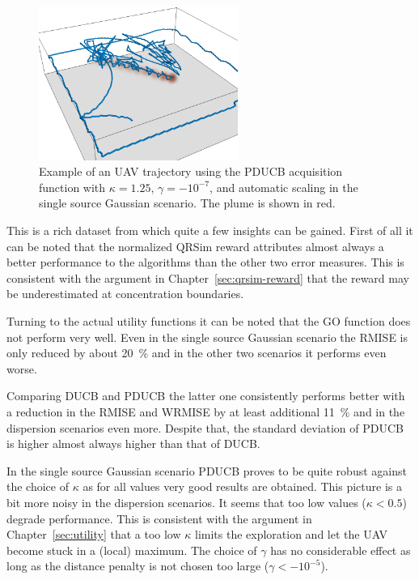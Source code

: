 \begin{figure}
    \centering
    \includegraphics[width=6.5cm]{plots/trajectory}
    \caption[Example of an UAV trajectory]{Example of an UAV trajectory using 
        the PDUCB acquisition function with $\kappa = 1.25$, $\gamma 
        = -10^{-7}$, and automatic scaling in the single source Gaussian 
        scenario. The plume is shown in red.}\label{fig:trajectory}
\end{figure}

This is a rich dataset from which quite a few insights can be gained. First of 
all it can be noted that the normalized QRSim reward attributes almost always 
a better performance to the algorithms than the other two error measures.  This 
is consistent with the argument in Chapter~\ref{sec:qrsim-reward} that the 
reward may be underestimated at concentration boundaries.

Turning to the actual utility functions it can be noted that the GO function 
does not perform very well.  Even in the single source Gaussian scenario the 
RMISE is only reduced by about \SI{20}{\percent} and in the other two scenarios 
it performs even worse.

Comparing DUCB and PDUCB the latter one consistently performs better with 
a reduction in the RMISE and WRMISE by at least additional \SI{11}{\percent} and 
in the dispersion scenarios even more.  Despite that, the standard deviation of 
PDUCB is higher almost always higher than that of DUCB\@.

In the single source Gaussian scenario PDUCB proves to be quite robust against 
the choice of $\kappa$ as for all values very good results are obtained. This 
picture is a bit more noisy in the dispersion scenarios. It seems that too low 
values ($\kappa < 0.5$) degrade performance. This is consistent with the 
argument in Chapter~\ref{sec:utility} that a too low $\kappa$ limits the 
exploration and let the UAV become stuck in a (local) maximum. The choice of 
$\gamma$ has no considerable effect as long as the distance penalty is not 
chosen too large ($\gamma < -10^{-5}$).

